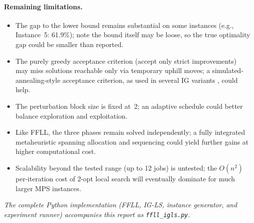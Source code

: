 \documentclass[11pt,a4paper]{article}
\begin{document}
\paragraph{Remaining limitations.}
\begin{itemize}
  \item The gap to the lower bound remains substantial on some instances
    (e.g., Instance~5: 61.9\%); note the bound itself may be loose, so the
    true optimality gap could be smaller than reported.
  \item The purely greedy acceptance criterion (accept only strict
    improvements) may miss solutions reachable only via temporary uphill
    moves; a simulated-annealing-style acceptance criterion, as used in
    several IG variants \citep{ruiz2007simple}, could help.
  \item The perturbation block size is fixed at~2; an adaptive schedule
    could better balance exploration and exploitation.
  \item Like FFLL, the three phases remain solved independently; a fully
    integrated metaheuristic spanning allocation and sequencing could
    yield further gains at higher computational cost.
  \item Scalability beyond the tested range (up to 12 jobs) is untested;
    the $O(n^2)$ per-iteration cost of 2-opt local search will eventually
    dominate for much larger MPS instances.
\end{itemize}

\bigskip
\noindent\textit{The complete Python implementation (FFLL, IG-LS, instance
generator, and experiment runner) accompanies this report as
\texttt{ffll\_igls.py}.}

\newpage


\end{document}
